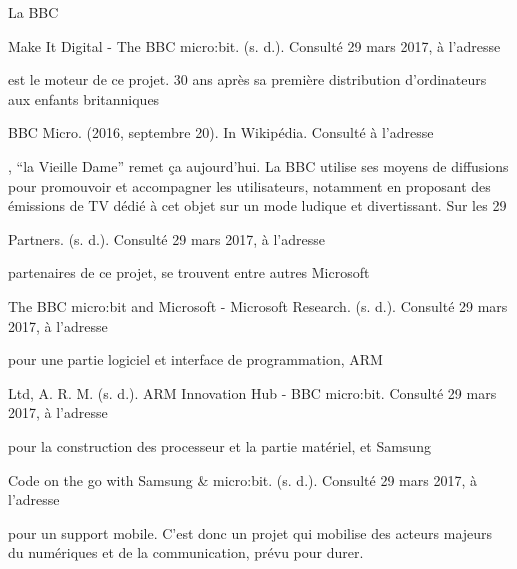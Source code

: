 \documentclass[letterpaper,10pt,french]{sphinxmanual}
\begin{document}
La BBC %
\begin{footnote}[1]\sphinxAtStartFootnote
Make It Digital - The BBC micro:bit. (s. d.).
Consulté 29 mars 2017, à l’adresse
%
\end{footnote} est le moteur de ce projet. 30 ans
après sa première distribution d’ordinateurs aux enfants
britanniques %
\begin{footnote}[2]\sphinxAtStartFootnote
BBC Micro. (2016, septembre 20).
In Wikipédia. Consulté à l’adresse
%
\end{footnote}, “la Vieille Dame” remet ça
aujourd’hui. La BBC utilise ses moyens de diffusions
pour promouvoir et accompagner les utilisateurs,
notamment en proposant des émissions de TV dédié à cet
objet sur un mode ludique et divertissant.
Sur les 29 %
\begin{footnote}[3]\sphinxAtStartFootnote
Partners. (s. d.). Consulté 29 mars 2017, à l’adresse
%
\end{footnote} partenaires de ce projet,
se trouvent entre autres Microsoft %
\begin{footnote}[4]\sphinxAtStartFootnote
The BBC micro:bit and Microsoft -
Microsoft Research. (s. d.). Consulté 29 mars 2017,
à l’adresse
%
\end{footnote} pour une partie
logiciel et interface de programmation, ARM %
\begin{footnote}[5]\sphinxAtStartFootnote
Ltd, A. R. M. (s. d.). ARM \textbar{} Innovation Hub -
BBC micro:bit. Consulté 29 mars 2017, à l’adresse
%
\end{footnote} pour
la construction des processeur et la partie matériel,
et Samsung %
\begin{footnote}[6]\sphinxAtStartFootnote
Code on the go with Samsung \& micro:bit.
(s. d.). Consulté 29 mars 2017, à l’adresse
%
\end{footnote} pour un support mobile. C’est donc un
projet qui mobilise des acteurs majeurs du numériques
et de la communication, prévu pour durer.

\end{document}
